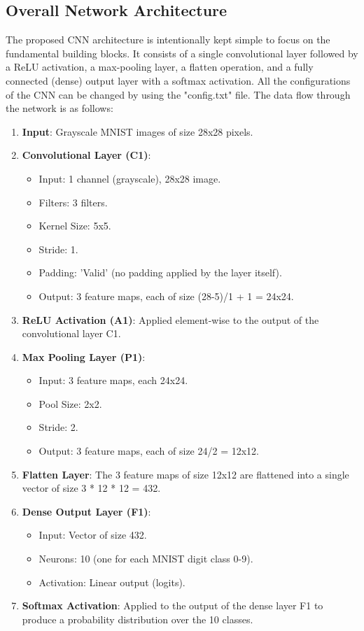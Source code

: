 \documentclass[conference]{IEEEtran}
\begin{document}
\subsection{Overall Network Architecture}
The proposed CNN architecture is intentionally kept simple to focus on the fundamental building blocks. It consists of a single convolutional layer followed by a ReLU activation, a max-pooling layer, a flatten operation, and a fully connected (dense) output layer with a softmax activation. All the configurations of the CNN can be changed by using the "config.txt" file. The data flow through the network is as follows:

\begin{enumerate}
    \item \textbf{Input}: Grayscale MNIST images of size 28x28 pixels.
    \item \textbf{Convolutional Layer (C1)}:
        \begin{itemize}
            \item Input: 1 channel (grayscale), 28x28 image.
            \item Filters: 3 filters.
            \item Kernel Size: 5x5.
            \item Stride: 1.
            \item Padding: 'Valid' (no padding applied by the layer itself).
            \item Output: 3 feature maps, each of size (28-5)/1 + 1 = 24x24.
        \end{itemize}
    \item \textbf{ReLU Activation (A1)}: Applied element-wise to the output of the convolutional layer C1.
    \item \textbf{Max Pooling Layer (P1)}:
        \begin{itemize}
            \item Input: 3 feature maps, each 24x24.
            \item Pool Size: 2x2.
            \item Stride: 2.
            \item Output: 3 feature maps, each of size 24/2 = 12x12.
        \end{itemize}
    \item \textbf{Flatten Layer}: The 3 feature maps of size 12x12 are flattened into a single vector of size 3 * 12 * 12 = 432.
    \item \textbf{Dense Output Layer (F1)}:
        \begin{itemize}
            \item Input: Vector of size 432.
            \item Neurons: 10 (one for each MNIST digit class 0-9).
            \item Activation: Linear output (logits).
        \end{itemize}
    \item \textbf{Softmax Activation}: Applied to the output of the dense layer F1 to produce a probability distribution over the 10 classes.
\end{enumerate}
\end{document}
